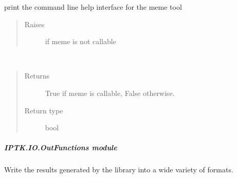 \documentclass[letterpaper,10pt,english]{sphinxmanual}
\begin{document}

\begin{fulllineitems}
\label{\detokenize{IPTK.IO:IPTK.IO.MEMEInterface.get_meme_help}}
print the command line help interface for the meme tool
\begin{quote}\begin{description}
\item[{Raises}] \leavevmode
{} \textendash{} if meme is not callable

\end{description}\end{quote}

\end{fulllineitems}


\begin{fulllineitems}
\label{\detokenize{IPTK.IO:IPTK.IO.MEMEInterface.is_meme_callable}}~\begin{quote}\begin{description}
\item[{Returns}] \leavevmode
True if meme is callable, False otherwise.

\item[{Return type}] \leavevmode
bool

\end{description}\end{quote}

\end{fulllineitems}



\subparagraph{IPTK.IO.OutFunctions module}
\label{\detokenize{IPTK.IO:module-IPTK.IO.OutFunctions}}\label{\detokenize{IPTK.IO:iptk-io-outfunctions-module}}
Write the results generated by the library into a wide variety of formats.
\end{document}
